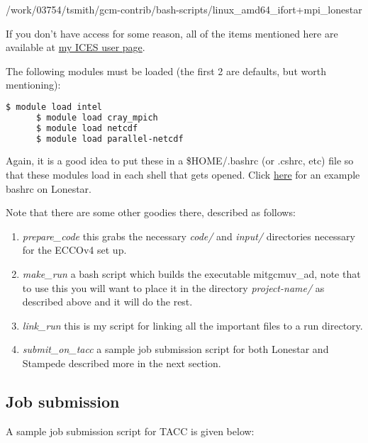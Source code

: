 \documentclass[a4paper,11pt]{article}
\begin{document}
	/work/03754/tsmith/gcm-contrib/bash-scripts/linux\_amd64\_ifort+mpi\_lonestar 

	If you don't have access for some reason, all of the items mentioned here are available at \href{http://users.ices.utexas.edu/~tsmith/bash-scripts/}{my ICES user page}.

	The following modules must be loaded (the first 2 are defaults, but worth mentioning): 

	\begin{lstlisting}[language=bash]
	  $ module load intel
	  $ module load cray_mpich
	  $ module load netcdf
	  $ module load parallel-netcdf
	\end{lstlisting}

	Again, it is a good idea to put these in a \$HOME/.bashrc (or .cshrc, etc) file so that these modules load in each shell that gets opened. Click \href{http://users.ices.utexas.edu/~tsmith/bash-scripts/bashrc_tsmith_lonestar}{here} for an example bashrc on Lonestar.


	Note that there are some other goodies there, described as follows:
	\begin{enumerate}
	  \item \textit{prepare\_code} this grabs the necessary \textit{code/} and \textit{input/} directories necessary for the ECCOv4 set up. 
	  \item \textit{make\_run} a bash script which builds the executable mitgcmuv\_ad, note that to use this you will want to place it in the directory \textit{project-name/} as described above and it will do the rest. 
	  \item \textit{link\_run} this is my script for linking all the important files to a run directory.  
	  \item \textit{submit\_on\_tacc} a sample job submission script for both Lonestar and Stampede described more in the next section.
	\end{enumerate} 

	\subsection{Job submission} 

	A sample job submission script for TACC is given below: 
	
	
\end{document}
